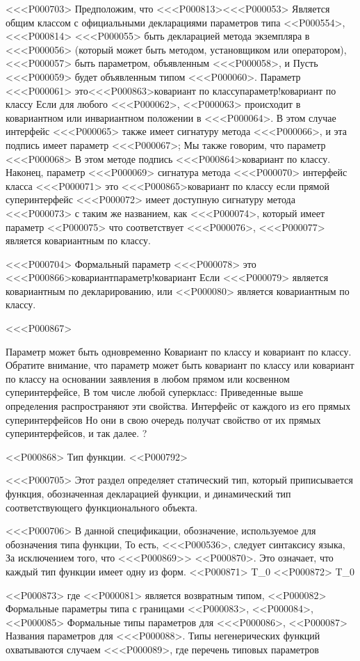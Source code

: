{<<<P000703>%
Предположим, что <<<P000813><<<P000053> Является общим классом
с официальными декларациями параметров типа
<<P000554>,
<<<P000814>%
<<<P000055> быть декларацией метода экземпляра в <<<P000056>
(который может быть методом, установщиком или оператором),
<<<P000057> быть параметром, объявленным <<<P000058>, и
Пусть <<<P000059> будет объявленным типом <<<P000060>.
%
Параметр <<<P000061> это<<<P000863>{ковариант по классу}{параметр!ковариант по классу}
Если для любого <<<P000062>,
<<P000063> происходит в ковариантном или инвариантном положении в <<<P000064>.
%
В этом случае интерфейс <<<P000065> также имеет сигнатуру метода <<<P000066>,
и эта подпись имеет параметр <<<P000067>;
Мы также говорим, что параметр <<<P000068> В этом методе подпись
<<<P000864>{ковариант по классу}.
Наконец, параметр <<<P000069> сигнатура метода <<<P000070>
интерфейс класса <<<P000071> это
<<<P000865>{ковариант по классу}
если прямой суперинтерфейс <<<P000072>
имеет доступную сигнатуру метода <<<P000073> с таким же названием, как <<<P000074>,
который имеет параметр <<P000075> что соответствует <<<P000076>,
<<<P000077> является ковариантным по классу.

<<<P000704>%
Формальный параметр <<<P000078> это
<<<P000866>{ковариант}{параметр!ковариант}
Если <<<P000079> является ковариантным по декларированию, или <<P000080> является ковариантным по классу.

<<<P000867>{%
Параметр может быть одновременно
Ковариант по классу и ковариант по классу.
Обратите внимание, что параметр может быть
ковариант по классу или ковариант по классу
на основании заявления в любом прямом или косвенном суперинтерфейсе,
В том числе любой суперкласс:
Приведенные выше определения распространяют эти свойства.
Интерфейс от каждого из его прямых суперинтерфейсов
Но они в свою очередь получат
свойство от их прямых суперинтерфейсов,
и так далее.%
?


<<P000868> Тип функции.
<<P000792>

<<<P000705>%
Этот раздел определяет статический тип, который приписывается
функция, обозначенная декларацией функции,
и динамический тип соответствующего функционального объекта.

<<<P000706>%
В данной спецификации,
обозначение, используемое для обозначения типа функции,
То есть, <<<P000536>,
следует синтаксису языка,
За исключением того, что <<<P000869>>
<<P000870>.
Это означает, что каждый тип функции имеет одну из форм.
<<P000871> T_0
<<P000872> T_0

<<P000873>
где <<P000081> является возвратным типом,
<<P000082> Формальные параметры типа с границами <<P000083>, <<P000084>,
<<P000085> Формальные типы параметров для <<<P000086>,
<<P000087> Названия параметров для <<<P000088>.
Типы негенерических функций охватываются случаем <<<P000089>,
где перечень типовых параметров
}}
